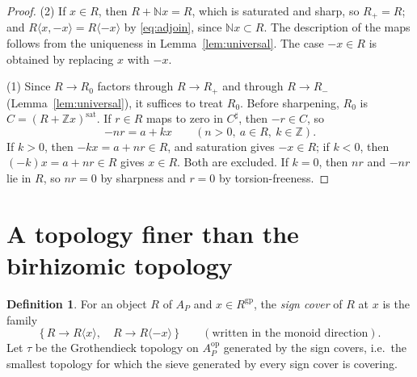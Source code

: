 \documentclass[12pt]{article}
\newcommand{\N}{\mathbb N}
\newcommand{\Z}{\mathbb Z}
\newcommand{\gp}{\mathrm{gp}}
\newcommand{\sat}{\mathrm{sat}}
\theoremstyle{definition}
\newtheorem{definition}[theorem]{Definition}
\theoremstyle{remark}
\begin{document}
\begin{proof}
(2) If \(x\in R\), then \(R+\N x=R\), which is saturated and sharp, so
\(R_+=R\); and \(R\langle x,-x\rangle=R\langle -x\rangle\) by
\eqref{eq:adjoin}, since \(\N x\subset R\).  The description of the maps
follows from the uniqueness in Lemma~\ref{lem:universal}.  The case
\(-x\in R\) is obtained by replacing \(x\) with \(-x\).

(1) Since \(R\to R_0\) factors through \(R\to R_+\) and through \(R\to R_-\)
(Lemma~\ref{lem:universal}), it suffices to treat \(R_0\).  Before
sharpening, \(R_0\) is \(C=(R+\Z x)^{\sat}\).  If \(r\in R\) maps to zero in
\(C^\sharp\), then \(-r\in C\), so
\[
                   -nr=a+kx
       \qquad(n>0,\ a\in R,\ k\in\Z).
\]
If \(k>0\), then \(-kx=a+nr\in R\), and saturation gives \(-x\in R\);
if \(k<0\), then \((-k)x=a+nr\in R\) gives \(x\in R\).  Both are excluded.
If \(k=0\), then \(nr\) and \(-nr\) lie in \(R\), so \(nr=0\) by sharpness
and \(r=0\) by torsion-freeness.
\end{proof}

\section{A topology finer than the birhizomic topology}
\label{sec:tau}

\begin{definition}\label{def:tau}
For an object \(R\) of \(A_P\) and \(x\in R^{\gp}\), the \emph{sign cover}
of \(R\) at \(x\) is the family
\begin{equation}
             \{\,R\longrightarrow R\langle x\rangle,\quad
                    R\longrightarrow R\langle -x\rangle\,\}
             \qquad(\text{written in the monoid direction}).
                                                         \label{eq:binary}
\end{equation}
Let \(\tau\) be the Grothendieck topology on \(A_P^{\mathrm{op}}\) generated
by the sign covers, i.e.\ the smallest topology for which the sieve generated
by every sign cover is covering.
\end{definition}
\end{document}
